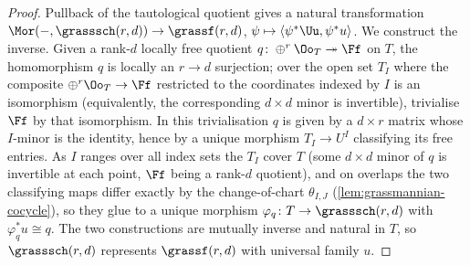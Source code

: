 \begin{proof}
  Pullback of the tautological quotient gives a natural transformation
  $\Mor(-,\grasssch(r,d))\to\grassf(r,d)$, $\psi\mapsto\langle\psi^*\Uu,\psi^*
  u\rangle$. We construct the inverse. Given a rank-$d$ locally free quotient
  $q\colon\oplus^r\Oo_T\twoheadrightarrow\Ff$ on $T$, the homomorphism $q$ is
  locally an $r\to d$ surjection; over the open set $T_I$ where the composite
  $\oplus^r\Oo_T\to\Ff$ restricted to the coordinates indexed by $I$ is an
  isomorphism (equivalently, the corresponding $d\times d$ minor is invertible),
  trivialise $\Ff$ by that isomorphism. In this trivialisation $q$ is given by a
  $d\times r$ matrix whose $I$-minor is the identity, hence by a unique morphism
  $T_I\to U^I$ classifying its free entries. As $I$ ranges over all index sets
  the $T_I$ cover $T$ (some $d\times d$ minor of $q$ is invertible at each point,
  $\Ff$ being a rank-$d$ quotient), and on overlaps the two classifying maps
  differ exactly by the change-of-chart $\theta_{I,J}$ (\cref{lem:grassmannian-cocycle}),
  so they glue to a unique morphism $\varphi_q\colon T\to\grasssch(r,d)$ with
  $\varphi_q^*u\cong q$. The two constructions are mutually inverse and natural
  in $T$, so $\grasssch(r,d)$ represents $\grassf(r,d)$ with universal family
  $u$.
\end{proof}
